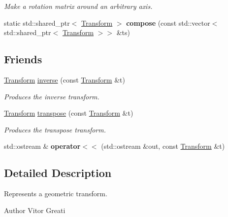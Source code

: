 \begin{DoxyCompactItemize}
\begin{DoxyCompactList}\small\item\em Make a rotation matrix around an arbitrary axis. \end{DoxyCompactList}\item 
\mbox{\label{classomg_1_1_transform_ad5808d16287c7ee7dd3933db91cd0a22}} 
static std\+::shared\+\_\+ptr$<$ \mbox{\hyperlink{classomg_1_1_transform}{Transform}} $>$ {\bfseries compose} (const std\+::vector$<$ std\+::shared\+\_\+ptr$<$ \mbox{\hyperlink{classomg_1_1_transform}{Transform}} $>$$>$ \&ts)
\end{DoxyCompactItemize}
\subsection*{Friends}
\begin{DoxyCompactItemize}
\item 
\mbox{\hyperlink{classomg_1_1_transform}{Transform}} \mbox{\hyperlink{classomg_1_1_transform_a31b9af404ee2dd732645cf796dc1aa62}{inverse}} (const \mbox{\hyperlink{classomg_1_1_transform}{Transform}} \&t)
\begin{DoxyCompactList}\small\item\em Produces the inverse transform. \end{DoxyCompactList}\item 
\mbox{\hyperlink{classomg_1_1_transform}{Transform}} \mbox{\hyperlink{classomg_1_1_transform_a10d88784f95b7d578a498fe5d3ee6fa8}{transpose}} (const \mbox{\hyperlink{classomg_1_1_transform}{Transform}} \&t)
\begin{DoxyCompactList}\small\item\em Produces the transpose transform. \end{DoxyCompactList}\item 
\mbox{\label{classomg_1_1_transform_a67902cb7ce8a41d0f379dc6b2b7d75a0}} 
std\+::ostream \& {\bfseries operator$<$$<$} (std\+::ostream \&out, const \mbox{\hyperlink{classomg_1_1_transform}{Transform}} \&t)
\end{DoxyCompactItemize}


\subsection{Detailed Description}
Represents a geometric transform. 

\begin{DoxyAuthor}{Author}
Vitor Greati 
\end{DoxyAuthor}


